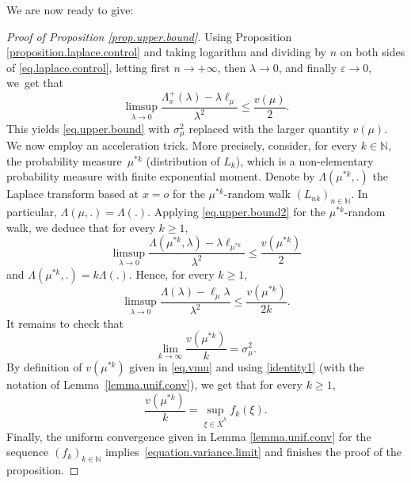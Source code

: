 \documentclass[10pt]{amsart}
\let\epsilon\varepsilon
\theoremstyle{plain}
\theoremstyle{definition}
\newcommand\N{\mathbb{N}}
\begin{document}
We are now ready to give:
\begin{proof}[Proof of Proposition \ref{prop.upper.bound}]
Using Proposition \ref{proposition.laplace.control}
and taking logarithm and dividing by $n$ on both sides of \eqref{eq.laplace.control}, letting first $n\to +\infty$, then $\lambda\to 0$, and finally $\epsilon\to 0$, we~get that
\begin{equation}\label{eq.upper.bound2} \limsup_{\lambda\to 0}
\frac{\Lambda_x^+(\lambda)-\lambda \ell_\mu}{\lambda^2}\leq \frac{v(\mu)}{2}.
\end{equation}
This yields \eqref{eq.upper.bound} with $\sigma_{\mu}^2$ replaced with the larger quantity $v(\mu)$. We now employ an acceleration trick. More precisely, consider, for every $k\in \N$, the probability measure~$\mu^{\ast k}$ (distribution of $L_k$), which is a non-elementary probability measure with finite exponential moment. Denote by $\Lambda(\mu^{\ast k},.)$ the Laplace transform based at $x=o$ for the $\mu^{\ast k}$-random walk $(L_{nk})_{n \in \N}$. In particular, $\Lambda(\mu,.)=\Lambda(.)$. Applying \eqref{eq.upper.bound2} for the
$\mu^{\ast k}$-random walk, we deduce that for every $k\geq 1$,
\[
\limsup_{\lambda\to 0}\frac{\Lambda({\mu^{\ast k}},\lambda)- \lambda \ell_{\mu^{\ast k}}}{\lambda^2}\leq \frac{ v(\mu^{\ast k})}{2}
\]
and $\Lambda({\mu^{\ast k}},.)=k \Lambda(.)$. Hence, for every $k \geq 1$,
\[
\limsup_{\lambda\to 0}\frac{\Lambda(\lambda)- \ell_\mu \lambda}{\lambda^2}\leq \frac{ v(\mu^{\ast k})}{2k}.
\]
It remains to check that
\begin{equation}\label{equation.variance.limit}
\lim_{k\to \infty}{\frac{v(\mu^{\ast k})}{k}}=\sigma_{\mu}^2.\end{equation}
By definition of $v(\mu^{\ast k})$ given in \eqref{eq.vmu} and using \eqref{identity1} (with the notation of Lem\-ma~\ref{lemma.unif.conv}), we get that for every $k \geq 1$,
\[
\frac{v(\mu^{\ast k})}{k}=\sup_{\xi\in \overline{X}^h}f_k(\xi).
\]
Finally, the uniform convergence given in Lemma \ref{lemma.unif.conv} for the sequence $(f_k)_{k\in \N}$ implies~\eqref{equation.variance.limit} and finishes the proof of the proposition.
\end{proof}
\end{document}
